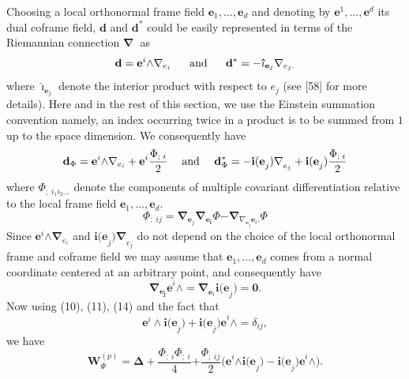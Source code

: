 \documentclass{article}
\begin{document}
Choosing a local orthonormal frame field $\mathbf{e}_{1},...,\mathbf{e}_{d}$
and denoting by $\mathbf{e}^{1},...,\mathbf{e}^{d}$ its dual coframe field, $%
\mathbf{d}$ and $\mathbf{d}^{\ast }$ could be easily represented in terms of
the Riemannian connection $\mathbf{\nabla }$\textbf{\ }as 
\begin{equation}
\mathbf{d}=\mathbf{e}^{i}\mathbf{\wedge \nabla }_{e_{i}}\text{ \ \ \ \ and \
\ \ \ }\mathbf{d}^{\ast }=-\mathbf{\hat{\imath}}_{\mathbf{e}_{j}}\mathbf{%
\nabla }_{e_{j}.}
\end{equation}%
where $\mathbf{\hat{\imath}}_{\mathbf{e}_{j}}$ denote the interior product
with respect to $e_{j}$ (see [58] for more details). Here and in the rest of
this section, we use the Einstein summation convention namely, an index
occurring twice in a product is to be summed from $1$ up to the space
dimension. We consequently have 
\begin{equation}
\mathbf{d}_{\Phi }=\mathbf{e}^{i}\mathbf{\wedge \nabla }_{e_{i}}+\mathbf{e}%
^{i}\frac{\Phi _{;\;i}}{2}\;\ \ \ \text{and \ \ \ }\mathbf{d}_{\Phi }^{\ast
}=-\mathbf{i(e}_{j}\mathbf{)\nabla }_{e_{j}}+\mathbf{i(e}_{j}\mathbf{)}\frac{%
\Phi _{;\;i}}{2}
\end{equation}%
where $\Phi _{;\;i_{1}i_{2}...}$ denote the components of multiple covariant
differentiation relative to the local frame field $\mathbf{e}_{1},...,%
\mathbf{e}_{d}.$%
\begin{equation}
\Phi _{;\;ij}=\mathbf{\nabla }_{\mathbf{e}_{j}}\mathbf{\nabla _{\mathbf{e}%
_{i}}}\Phi \mathbf{-\nabla }_{\nabla _{\mathbf{e}_{j}}\mathbf{e}_{i}.}\Phi
\end{equation}%
Since $\mathbf{e}^{i}\mathbf{\wedge \nabla }_{e_{i}}$ and $\mathbf{i(e}_{j}%
\mathbf{)\nabla }_{e_{j}}$ do not depend on the choice of the local
orthonormal frame and coframe field we may assume that $\mathbf{e}_{1},...,%
\mathbf{e}_{d}$ comes from a normal coordinate centered at an arbitrary
point, and consequently have 
\begin{equation}
\mathbf{\nabla _{\mathbf{e}_{j}}e}^{i}\mathbf{\wedge =\nabla }_{\mathbf{e}%
_{i}}\mathbf{i(e}_{j}\mathbf{)=0.}
\end{equation}%
Now using (10), (11), (14) and the fact that 
\begin{equation}
\mathbf{e}^{i}\wedge \mathbf{i(e}_{j}\mathbf{)+i(e}_{j}\mathbf{)e}^{i}\wedge
=\delta _{ij},
\end{equation}%
we have%
\begin{equation}
\mathbf{W}_{\Phi }^{\left( p\right) }\mathbf{=\Delta +}\frac{\Phi
_{;\;i}\Phi _{;\;i}}{4}\mathbf{+}\frac{\Phi _{;\;ij}}{2}\mathbf{(e}^{i}%
\mathbf{\wedge i(e}_{j}\mathbf{)-i(e}_{j}\mathbf{)e}^{i}\mathbf{\wedge ).}
\end{equation}%
\end{document}
